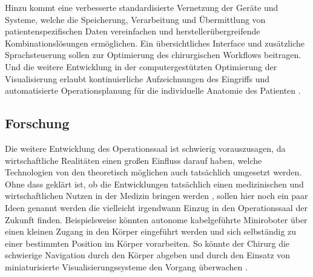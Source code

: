 Hinzu kommt eine verbesserte standardisierte Vernetzung der Geräte und Systeme, welche die Speicherung, Verarbeitung und Übermittlung von patientenspezifischen Daten vereinfachen und herstellerübergreifende Kombinationslösungen ermöglichen. Ein übersichtliches Interface und zusätzliche Sprachsteuerung sollen zur Optimierung des chirurgischen Workflows beitragen. Und die weitere Entwicklung in der computergestützten Optimierung der Visualisierung erlaubt kontinuierliche Aufzeichnungen des Eingriffs \cite{DerDigitaleOperationssaal} und automatisierte Operationsplanung für die individuelle Anatomie des Patienten \cite{CurrentAndFuture}. 

\subsection{Forschung}

Die weitere Entwicklung des Operationssaal ist schwierig vorauszusagen, da wirtschaftliche Realitäten einen großen Einfluss darauf haben, welche Technologien von den theoretisch möglichen auch tatsächlich umgesetzt werden. Ohne dass geklärt ist, ob die Entwicklungen tatsächlich einen medizinischen und wirtschaftlichen Nutzen in der Medizin bringen werden \cite{DerDigitaleOperationssaal}, sollen hier noch ein paar Ideen genannt werden die vielleicht irgendwann Einzug in den Operationssaal der Zukunft finden.
Beispielsweise könnten autonome kabelgeführte Miniroboter über einen kleinen Zugang in den Körper eingeführt werden und sich selbständig zu einer bestimmten Position im Körper vorarbeiten. So könnte der Chirurg die schwierige Navigation durch den Körper abgeben und durch den Einsatz von miniaturisierte Visualisierungssysteme den Vorgang überwachen  \cite{DerDigitaleOperationssaal}.



	
	



